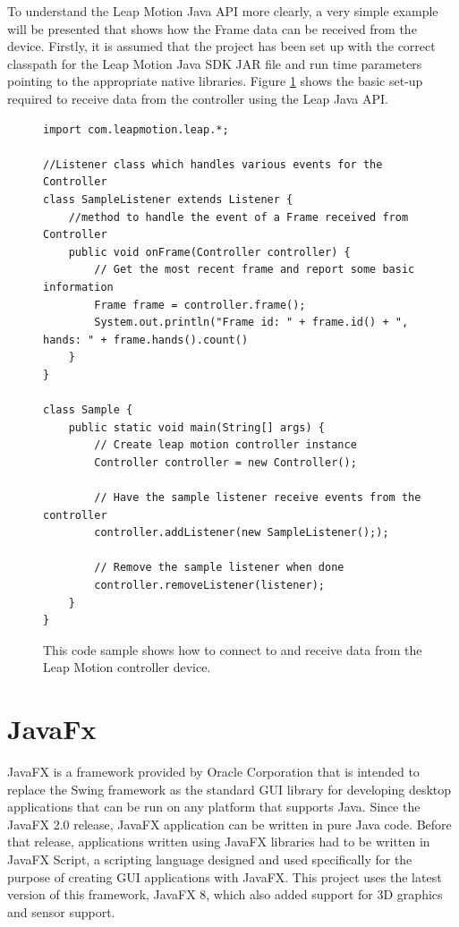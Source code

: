 To understand the Leap Motion Java API more clearly, a very simple example will be presented that shows how the Frame data can be received from the device. Firstly, it is assumed that the project has been set up with the correct classpath for the Leap Motion Java SDK JAR file and run time parameters pointing to the appropriate native libraries. Figure \ref{fig:leapMotionSample} shows the basic set-up required to receive data from the controller using the Leap Java API. 

\begin{figure}[th]
\centering
\begin{lstlisting}
import com.leapmotion.leap.*;

//Listener class which handles various events for the Controller
class SampleListener extends Listener {
    //method to handle the event of a Frame received from Controller
    public void onFrame(Controller controller) {
        // Get the most recent frame and report some basic information
        Frame frame = controller.frame();
        System.out.println("Frame id: " + frame.id() + ", hands: " + frame.hands().count()
    }
}

class Sample {
    public static void main(String[] args) {
        // Create leap motion controller instance
        Controller controller = new Controller();

        // Have the sample listener receive events from the controller
        controller.addListener(new SampleListener(););

        // Remove the sample listener when done
        controller.removeListener(listener);
    }
}
\end{lstlisting}
\caption[Leap Motion Sample]{This code sample shows how to connect to and receive data from the Leap Motion controller device.}
\label{fig:leapMotionSample}
\end{figure}





\section{JavaFx}
JavaFX is a framework provided by Oracle Corporation that is intended to replace the Swing framework as the standard GUI library for developing desktop applications that can be run on any platform that supports Java. Since the JavaFX 2.0 release, JavaFX application can be written in pure Java code. Before that release, applications written using JavaFX libraries had to be written in JavaFX Script, a scripting language designed and used specifically for the purpose of creating GUI applications with JavaFX. This project uses the latest version of this framework, JavaFX 8, which also added support for 3D graphics and sensor support. 


